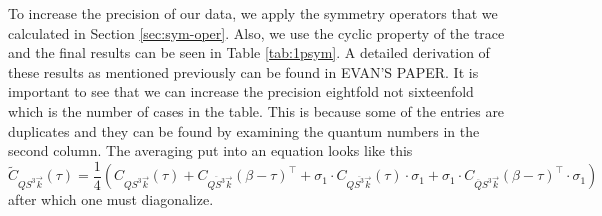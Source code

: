 To increase the precision of our data, we apply the symmetry operators that we calculated in Section \ref{sec:sym-oper}. Also, we use the cyclic property of the trace and the final results can be seen in Table \ref{tab:1psym}. A detailed derivation of these results as mentioned previously can be found in EVAN'S PAPER. It is important to see that we can increase the precision eightfold not sixteenfold which is the number of cases in the table. This is because some of the entries are duplicates and they can be found by examining the quantum numbers in the second column. The averaging put into an equation looks like this
\begin{equation}
  \tilde{C}_{QS^3\vec{k}}(\tau) = \frac{1}{4}\left( C_{QS^3\vec{k}}(\tau) + C_{\overline{QS^3}\vec{k}}(\beta-\tau)^\top + \sigma_1\cdot C_{Q\overline{S^3}\vec{k}}(\tau) \cdot\sigma_1 + \sigma_1\cdot C_{\overline{Q}S^3\vec{k}}(\beta-\tau)^\top \cdot\sigma_1 \right)
\end{equation}
after which one must diagonalize.

